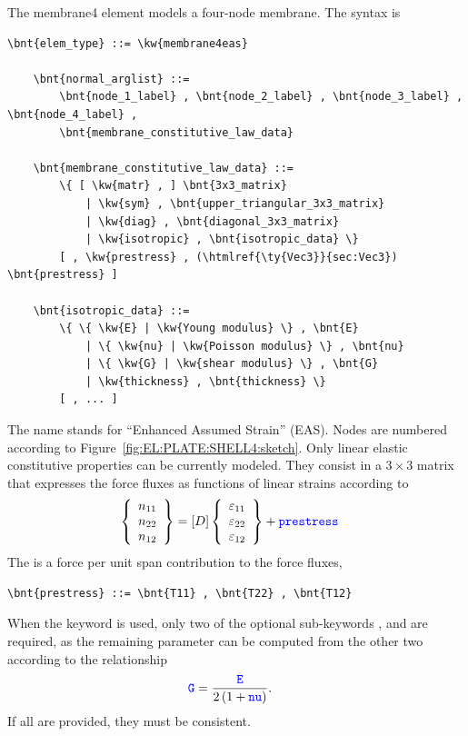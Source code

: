 The membrane4 element models a four-node membrane.
The syntax is
\begin{Verbatim}[commandchars=\\\{\}]
    \bnt{elem_type} ::= \kw{membrane4eas} 

    \bnt{normal_arglist} ::=
        \bnt{node_1_label} , \bnt{node_2_label} , \bnt{node_3_label} , \bnt{node_4_label} ,
        \bnt{membrane_constitutive_law_data}

    \bnt{membrane_constitutive_law_data} ::=
        \{ [ \kw{matr} , ] \bnt{3x3_matrix}
            | \kw{sym} , \bnt{upper_triangular_3x3_matrix}
            | \kw{diag} , \bnt{diagonal_3x3_matrix}
            | \kw{isotropic} , \bnt{isotropic_data} \}
        [ , \kw{prestress} , (\htmlref{\ty{Vec3}}{sec:Vec3}) \bnt{prestress} ]

    \bnt{isotropic_data} ::=
        \{ \{ \kw{E} | \kw{Young modulus} \} , \bnt{E}
            | \{ \kw{nu} | \kw{Poisson modulus} \} , \bnt{nu}
            | \{ \kw{G} | \kw{shear modulus} \} , \bnt{G}
            | \kw{thickness} , \bnt{thickness} \}
        [ , ... ]
\end{Verbatim}
The name  stands for ``Enhanced Assumed Strain'' (EAS).
Nodes are numbered according to Figure~\ref{fig:EL:PLATE:SHELL4:sketch}.
Only linear elastic constitutive properties can be currently modeled.
They consist in a $3 \times 3$ matrix that expresses the force
fluxes as functions of linear strains according to
\begin{align}
	\left\{ \begin{array}{c} 
		n_{11} \\
		n_{22} \\
		n_{12}
	 \end{array} \right\}
	&=
	\left[ D \right]
	\left\{ \begin{array}{c} 
		\varepsilon_{11} \\
		\varepsilon_{22} \\
		\varepsilon_{12}
	 \end{array} \right\}
	+
	\textcolor{blue}{\texttt{prestress}}
\end{align}
The  is a force per unit span contribution
to the force fluxes,
\begin{Verbatim}[commandchars=\\\{\}]
    \bnt{prestress} ::= \bnt{T11} , \bnt{T22} , \bnt{T12}
\end{Verbatim}

When the  keyword is used, only two of the optional
sub-keywords ,  and  are required, as the remaining
parameter can be computed from the other two according to the relationship
\begin{align}
	\textcolor{blue}{\texttt{G}}
	&=
	\frac{\textcolor{blue}{\texttt{E}}}{2\left( 1 + \textcolor{blue}{\texttt{nu}} \right)}
	.
\end{align}
If all are provided, they must be consistent.


